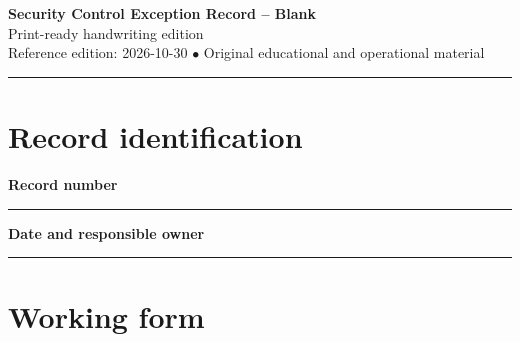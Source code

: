 \documentclass[10pt,letterpaper]{article}
\begin{document}
\begin{center}
{\LARGE\bfseries\color{cdblue}Security Control Exception Record -- Blank}\\[7pt]
{\large Print-ready handwriting edition}\\[6pt]
{\small Reference edition: 2026-10-30 $\bullet$ Original educational and operational material}
\end{center}
\noindent\color{cdblue}\rule{\linewidth}{1.2pt}\color{black}
\vspace{0.4em}
\section{Record identification}
\textbf{Record number}\par
\noindent\rule{\linewidth}{0.35pt}\par\vspace{0.7em}
\textbf{Date and responsible owner}\par
\noindent\rule{\linewidth}{0.35pt}\par\vspace{0.7em}

\section{Working form}
\end{document}
